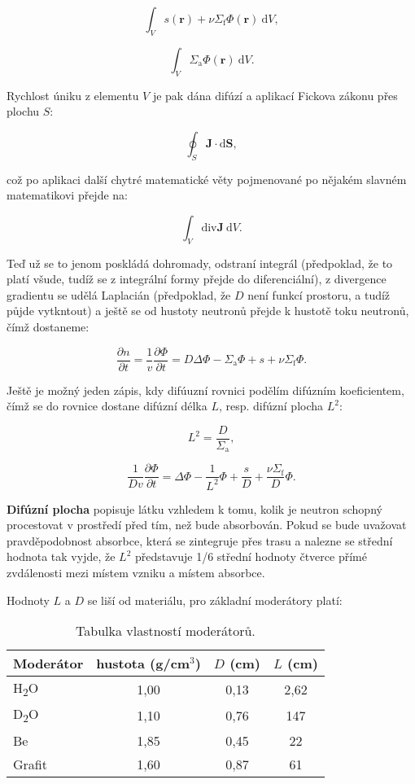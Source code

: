 $$ \boxed{\int_V s(\textbf{r}) + \nu \Sigma_\text{f} \Phi(\textbf{r}) \: \text{d} V,} $$

$$ \boxed{\int_V \Sigma_\text{a} \Phi(\textbf{r}) \: \text{d} V.} $$

Rychlost úniku z elementu $V$ je pak dána difúzí a aplikací Fickova zákonu přes plochu $S$:

$$ \oint_S \textbf{J} \cdot \text{d} \textbf{S}, $$

což po aplikaci další chytré matematické věty pojmenované po nějakém slavném matematikovi přejde na:

$$ \boxed{\int_V \text{div} \textbf{J} \: \text{d} V.} $$

Teď už se to jenom poskládá dohromady, odstraní integrál (předpoklad, že to platí všude, tudíž se z integrální formy přejde do diferenciální), z divergence gradientu se udělá Laplacián (předpoklad, že $D$ není funkcí prostoru, a tudíž půjde vytkntout) a ještě se od hustoty neutronů přejde k hustotě toku neutronů, čímž dostaneme:

\begin{equation}
    \boxed{
        \dfrac{\partial n}{\partial t} = \dfrac{1}{v} \dfrac{\partial \Phi}{\partial t} = D \Delta \Phi - \Sigma_\text{a} \Phi + s + \nu \Sigma_\text{f} \Phi.
    }
\end{equation}

Ještě je možný jeden zápis, kdy difúuzní rovnici podělím difúzním koeficientem, čímž se do rovnice dostane difúzní délka $L$, resp. difúzní plocha $L^2$:

$$ L^2 = \dfrac{D}{\Sigma_\text{a}}, $$

\begin{equation}
    \boxed{
        \dfrac{1}{D v} \dfrac{\partial \Phi}{\partial t} = \Delta \Phi - \dfrac{1}{L^2} \Phi + \dfrac{s}{D} + \dfrac{\nu \Sigma_\text{f}}{D} \Phi.
    }
\end{equation}

\textbf{Difúzní plocha} popisuje látku vzhledem k tomu, kolik je neutron schopný procestovat v prostředí před tím, než bude absorbován. Pokud se bude uvažovat pravděpodobnost absorbce, která se zintegruje přes trasu a nalezne se střední hodnota tak vyjde, že $L^2$ představuje 1/6 střední hodnoty čtverce přímé zvdálenosti mezi místem vzniku a místem absorbce.

Hodnoty $L$ a $D$ se liší od materiálu, pro základní moderátory platí:

\begin{table}[h!]
    \centering
    \begin{tabular}{lccc}
    \toprule
    \textbf{Moderátor} & \textbf{hustota (g/cm$^3$)} & $D$ \textbf{(cm)} & $L$ \textbf{(cm)} \\ \midrule
    H\textsubscript{2}O & 1,00 & 0,13 & 2,62 \\
    D\textsubscript{2}O & 1,10 & 0,76 & 147 \\
    Be & 1,85 & 0,45 & 22 \\
    Grafit & 1,60 & 0,87 & 61 \\ \bottomrule
    \end{tabular}
    \caption{Tabulka vlastností moderátorů.}
\end{table}
    

